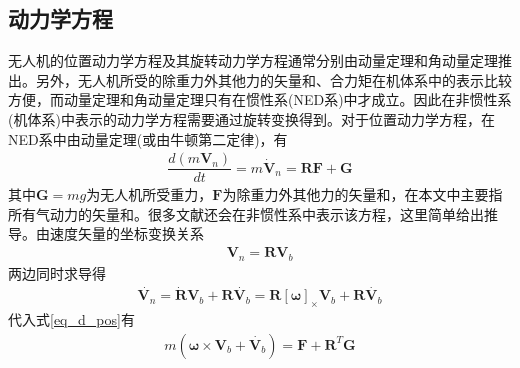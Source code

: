 \subsection{动力学方程}
无人机的位置动力学方程及其旋转动力学方程通常分别由动量定理和角动量定理推出。另外，无人机所受的除重力外其他力的矢量和、合力矩在机体系中的表示比较方便，而动量定理和角动量定理只有在惯性系(NED系)中才成立。因此在非惯性系(机体系)中表示的动力学方程需要通过旋转变换得到。对于位置动力学方程，在NED系中由动量定理(或由牛顿第二定律)，有
\begin{align}
\dfrac{d(m\bm{V}_n)}{d t}=m \dot{\bm{V}}_n=\bm{R}\bm{F}+\bm{G}	\label{eq_d_pos}
\end{align}
其中$ \bm{G}=mg $为无人机所受重力，$ \bm{F} $为除重力外其他力的矢量和，在本文中主要指所有气动力的矢量和。很多文献还会在非惯性系中表示该方程，这里简单给出推导。由速度矢量的坐标变换关系
\begin{align}
\bm{V}_n=\bm{R}\bm{V}_b
\end{align}
两边同时求导得
\begin{align}
\dot{\bm{V}_n}=\dot{\bm{R}}\bm{V}_b+\bm{R}\dot{\bm{V}_b}=\bm{R}[\bm{\omega}]_{\times}\bm{V}_b+\bm{R}\dot{\bm{V}_b}
\end{align}
代入式\eqref{eq_d_pos}有
\begin{align}
m(\bm{\omega} \times \bm{V}_b+\dot{\bm{V}_b})=\bm{F}+\bm{R}^T\bm{G}
\end{align}


